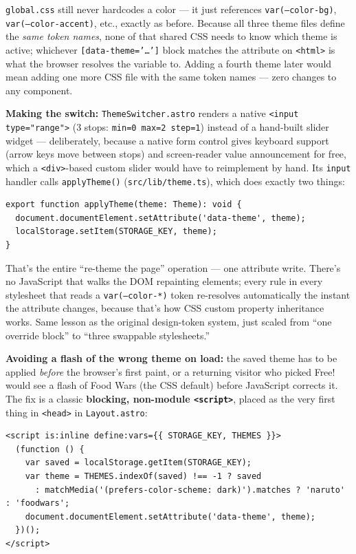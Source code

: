 \documentclass[11pt]{article}
\begin{document}
\texttt{global.css} still never hardcodes a color --- it just references
\texttt{var(--color-bg)}, \texttt{var(--color-accent)}, etc., exactly as
before. Because all three theme files define the \emph{same token
names}, none of that shared CSS needs to know which theme is active;
whichever \texttt{[data-theme='\ldots']} block matches the attribute on
\texttt{<html>} is what the browser resolves the variable to. Adding a
fourth theme later would mean adding one more CSS file with the same
token names --- zero changes to any component.

\textbf{Making the switch:} \texttt{ThemeSwitcher.astro} renders a native
\texttt{<input type="range">} (3 stops: \texttt{min=0 max=2 step=1})
instead of a hand-built slider widget --- deliberately, because a native
form control gives keyboard support (arrow keys move between stops) and
screen-reader value announcement for free, which a \texttt{<div>}-based
custom slider would have to reimplement by hand. Its \texttt{input}
handler calls \texttt{applyTheme()} (\texttt{src/lib/theme.ts}), which
does exactly two things:

\begin{lstlisting}
export function applyTheme(theme: Theme): void {
  document.documentElement.setAttribute('data-theme', theme);
  localStorage.setItem(STORAGE_KEY, theme);
}
\end{lstlisting}

That's the entire ``re-theme the page'' operation --- one attribute
write. There's no JavaScript that walks the DOM repainting elements;
every rule in every stylesheet that reads a \texttt{var(--color-*)} token
re-resolves automatically the instant the attribute changes, because
that's how CSS custom property inheritance works. Same lesson as the
original design-token system, just scaled from ``one override block'' to
``three swappable stylesheets.''

\textbf{Avoiding a flash of the wrong theme on load:} the saved theme has
to be applied \emph{before} the browser's first paint, or a returning
visitor who picked Free! would see a flash of Food Wars (the CSS
default) before JavaScript corrects it. The fix is a classic
\textbf{blocking, non-module \texttt{<script>}}, placed as the very first
thing in \texttt{<head>} in \texttt{Layout.astro}:

\begin{lstlisting}
<script is:inline define:vars={{ STORAGE_KEY, THEMES }}>
  (function () {
    var saved = localStorage.getItem(STORAGE_KEY);
    var theme = THEMES.indexOf(saved) !== -1 ? saved
      : matchMedia('(prefers-color-scheme: dark)').matches ? 'naruto' : 'foodwars';
    document.documentElement.setAttribute('data-theme', theme);
  })();
</script>
\end{lstlisting}
\end{document}
